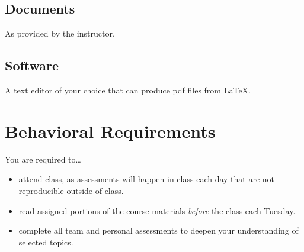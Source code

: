 \documentclass[12pt]{amsart}
\begin{document}
\subsection{Documents} As provided by the instructor.
\subsection{Software} A text editor of your choice that can produce pdf files from \LaTeX.
\section{Behavioral Requirements}

You are required to\ldots
\begin{itemize}
\item attend class, as assessments will happen in class each day that are not reproducible outside of class.
\item read assigned portions of the course materials \textit{before} the class each Tuesday.
\item complete all team and personal assessments to deepen your understanding of selected topics.
\end{itemize}
\end{document}
